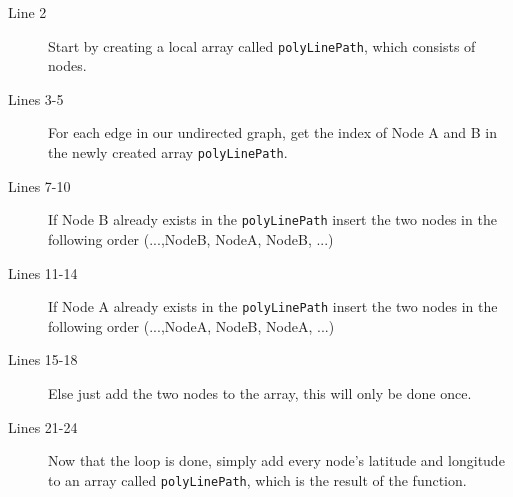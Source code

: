 \begin{description}
\item[Line 2] Start by creating a local array called  \lstinline|polyLinePath|, which consists of nodes.
\item[Lines 3-5] For each edge in our undirected graph, get the index of Node A and B in the newly created array \lstinline|polyLinePath|.
\item[Lines 7-10] If Node B already exists in the \lstinline|polyLinePath| insert the two nodes in the following order (...,NodeB, NodeA, NodeB, ...)
\item[Lines 11-14] If Node A already exists in the \lstinline|polyLinePath| insert the two nodes in the following order (...,NodeA, NodeB, NodeA, ...)
\item[Lines 15-18] Else just add the two nodes to the array, this will only be done once.
\item[Lines 21-24] Now that the loop is done, simply add every node's latitude and longitude to an array called \lstinline|polyLinePath|, which is the result of the function. 
\end{description}

